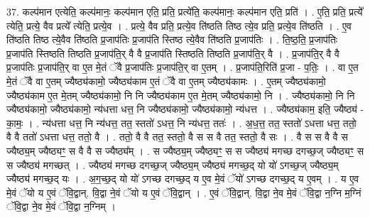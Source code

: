 \documentclass[17pt]{extarticle}
\begin{document}
37. कल्प॑मान एत्येति॒ कल्प॑मानः॒ कल्प॑मान एति॒ प्रति॒ प्रत्ये॑ति॒ कल्प॑मानः॒ कल्प॑मान एति॒ प्रति॑ । . ए॒ति॒ प्रति॒ प्रत्ये᳚ त्येति॒ प्रत्ये॒ वैव प्रत्ये᳚ त्येति॒ प्रत्ये॒व । . प्रत्ये॒ वैव प्रति॒ प्रत्ये॒व ति॑ष्ठति तिष्ठ त्ये॒व प्रति॒ प्रत्ये॒व ति॑ष्ठति । . ए॒व ति॑ष्ठति तिष्ठ त्ये॒वैव ति॑ष्ठति प्र॒जाप॑तिः प्र॒जाप॑ति स्तिष्ठ त्ये॒वैव ति॑ष्ठति प्र॒जाप॑तिः । . ति॒ष्ठ॒ति॒ प्र॒जाप॑तिः प्र॒जाप॑ति स्तिष्ठति तिष्ठति प्र॒जाप॑ति॒र् वै वै प्र॒जाप॑ति स्तिष्ठति तिष्ठति प्र॒जाप॑ति॒र् वै । . प्र॒जाप॑ति॒र् वै वै प्र॒जाप॑तिः प्र॒जाप॑ति॒र् वा ए॒त मे॒तं ॅवै प्र॒जाप॑तिः प्र॒जाप॑ति॒र् वा ए॒तम् । . प्र॒जाप॑ति॒रिति॑ प्र॒जा - प॒तिः॒ । . वा ए॒त मे॒तं ॅवै वा ए॒तम् ज्यैष्ठ्य॑कामो॒ ज्यैष्ठ्य॑काम ए॒तं ॅवै वा ए॒तम् ज्यैष्ठ्य॑कामः । . ए॒तम् ज्यैष्ठ्य॑कामो॒ ज्यैष्ठ्य॑काम ए॒त मे॒तम् ज्यैष्ठ्य॑कामो॒ नि नि ज्यैष्ठ्य॑काम ए॒त मे॒तम् ज्यैष्ठ्य॑कामो॒ नि । . ज्यैष्ठ्य॑कामो॒ नि नि ज्यैष्ठ्य॑कामो॒ ज्यैष्ठ्य॑कामो॒ न्य॑धत्ता धत्त॒ नि ज्यैष्ठ्य॑कामो॒ ज्यैष्ठ्य॑कामो॒ न्य॑धत्त । . ज्यैष्ठ्य॑काम॒ इति॒ ज्यैष्ठ्य॑ - का॒मः॒ । . न्य॑धत्ता धत्त॒ नि न्य॑धत्त॒ तत॒ स्ततो॑ ऽधत्त॒ नि न्य॑धत्त॒ ततः॑ । . अ॒ध॒त्त॒ तत॒ स्ततो॑ ऽधत्ता धत्त॒ ततो॒ वै वै ततो॑ ऽधत्ता धत्त॒ ततो॒ वै । . ततो॒ वै वै तत॒ स्ततो॒ वै स स वै तत॒ स्ततो॒ वै सः । . वै स स वै वै स ज्यैष्ठ्य॒म् ज्यैष्ठ्यꣳ॒॒ स वै वै स ज्यैष्ठ्य᳚म् । . स ज्यैष्ठ्य॒म् ज्यैष्ठ्यꣳ॒॒ स स ज्यैष्ठ्य॑ मगच्छ दगच्छ॒ज् ज्यैष्ठ्यꣳ॒॒ स स ज्यैष्ठ्य॑ मगच्छत् । . ज्यैष्ठ्य॑ मगच्छ दगच्छ॒ज् ज्यैष्ठ्य॒म् ज्यैष्ठ्य॑ मगच्छ॒द् यो यो॑ ऽगच्छ॒ज् ज्यैष्ठ्य॒म् ज्यैष्ठ्य॑ मगच्छ॒द् यः । . अ॒ग॒च्छ॒द् यो यो॑ ऽगच्छ दगच्छ॒द् य ए॒व मे॒वं ॅयो॑ ऽगच्छ दगच्छ॒द् य ए॒वम् । . य ए॒व मे॒वं ॅयो य ए॒वं ॅवि॒द्वान्. वि॒द्वा ने॒वं ॅयो य ए॒वं ॅवि॒द्वान् । . ए॒वं ॅवि॒द्वान्. वि॒द्वा ने॒व मे॒वं ॅवि॒द्वा न॒ग्नि म॒ग्निं ॅवि॒द्वा ने॒व मे॒वं ॅवि॒द्वा न॒ग्निम् । \newline
\end{document}
